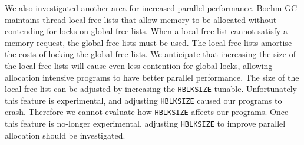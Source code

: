 We also investigated another area for increased parallel performance.
Boehm GC maintains thread local free lists that allow memory to be allocated
without contending for locks on global free lists.
When a local free list cannot satisfy a memory request, the global free
lists must be used.
The local free lists amortise the costs of locking the global free lists.
We anticipate that increasing the size of the local free lists will cause even
less contention for global locks,
allowing allocation intensive programs to have better parallel
performance.
The size of the local free list can be adjusted by increasing the
\texttt{HBLKSIZE} tunable.
Unfortunately this feature is experimental,
and adjusting \texttt{HBLKSIZE} caused our programs to crash.
Therefore we cannot evaluate how \texttt{HBLKSIZE} affects our
programs.
Once this feature is no-longer experimental,
adjusting \texttt{HBLKSIZE} to improve parallel allocation should be
investigated.


